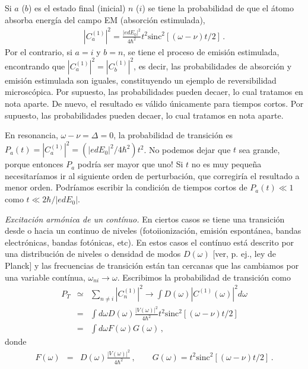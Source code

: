 \documentclass[twocolumn,aps,eqsecnum]{revtex4}
\begin{document}
Si $a$ ($b$) es el estado final (inicial) $n$ ($i$) se tiene la probabilidad de 
que el \'atomo absorba energ\'ia del campo EM (absorci\'on estimulada), 
%
\begin{eqnarray} 
|C_a^{(1)}|^2 = \frac{|edE_0|^2 }{4\hbar^2} t^2  
	\mathrm{sinc}^2{[(\omega -\nu) t/2]} \,. 	\label{eq:abs_pert1}
 \end{eqnarray}
Por el contrario, si $a=i$ y $b=n$, se tiene el proceso de emisi\'on 
estimulada, encontrando que $ |C_a^{(1)}|^2 =  |C_b^{(1)}|^2$, es decir, 
las probabilidades de absorci\'on y emisi\'on estimulada son iguales, 
constituyendo un ejemplo de reversibilidad microsc\'opica. Por supuesto, 
las probabilidades pueden decaer, lo cual tratamos en nota aparte. 
De nuevo, el resultado es v\'alido \'unicamente para tiempos cortos. 
Por supuesto, las probabilidades pueden decaer, lo cual tratamos en 
nota aparte. 

En resonancia, $\omega-\nu = \Delta =0$, la probabilidad de transici\'on 
es $P_a (t) = |C_a^{(1)}|^2 = (|edE_0|^2 / 4\hbar^2) t^2$. No podemos 
dejar que $t$ sea grande, porque entonces $P_a$ podr\'ia ser mayor que 
uno! Si $t$ no es muy peque\~na necesitar\'iamos ir al siguiente orden 
de perturbaci\'on, que corregir\'ia el resultado a menor orden. Podr\'iamos 
escribir la condici\'on  de tiempos cortos de $P_a(t) \ll 1$ como 
$t \ll 2\hbar/|edE_0|$.  

\vspace{3mm}
\textit{Excitaci\'on arm\'onica de un cont\'inuo.} %
\newline En ciertos casos se tiene una transici\'on desde o hacia un continuo 
de niveles (fotoiionizaci\'on, emisi\'on espont\'anea, bandas electr\'onicas, 
bandas fot\'onicas, etc). En estos casos el cont\'inuo est\'a descrito por una 
distribuci\'on de niveles o densidad de modos $D(\omega)$ [ver, p. ej., ley 
de Planck] y las frecuencias de transici\'on est\'an tan cercanas que las 
cambiamos por una variable cont\'inua, $\omega_{ni} \to \omega$. 
Escribimos la probabilidad de transici\'on como 
%
\begin{eqnarray} 
P_T &\simeq& \sum_{n \neq i}  |C_n^{(1)}|^2 	\rightarrow 
	\int D(\omega) |C^{(1)} (\omega)|^2 d\omega 	\nonumber \\ 
&=& \int d\omega D(\omega) \frac{|V (\omega)|^2}{4\hbar^2} t^2 
	\mathrm{sinc}^2{[(\omega -\nu) t/2]}  		\\ 
	&=&  \int d\omega F(\omega) G(\omega) \,, 	\nonumber 
\end{eqnarray}
donde 
%
\begin{eqnarray} 
F(\omega) &=& D(\omega) \frac{|V (\omega)|^2}{4\hbar^2} \,, 
	\qquad G(\omega) = t^2 \mathrm{sinc}^2{[(\omega -\nu) t/2]} \,. 
	\nonumber \\
\end{eqnarray}
  
\end{document}
